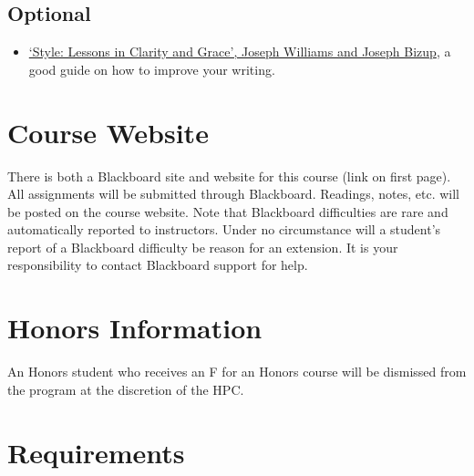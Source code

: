 \documentclass[article,oneside]{memoir}
\begin{document}
\subsection{Optional}

\begin{itemize}

\item \href{http://www.amazon.com/Style-Lessons-Clarity-Grace-11th/dp/0321898680/ref=sr_1_1?ie=UTF8&qid=1452356026&sr=8-1&keywords=lessons+in+clarity+and+grace}{`Style: Lessons in Clarity and Grace', Joseph Williams and Joseph Bizup}, a good guide on how to improve your writing. 
\end{itemize}
\section{Course Website}
There is both a Blackboard site and website for this course (link on first page). All assignments will be submitted through Blackboard. Readings, notes, etc. will be posted on the course website. Note that Blackboard difficulties are rare and automatically reported to instructors. Under no circumstance will a student's report of a Blackboard difficulty be reason for an extension. It is your responsibility to contact Blackboard support for help.

\section{Honors Information}
An Honors student who receives an F for an Honors course will be dismissed from the program at the discretion of the HPC.

\section{Requirements}
\end{document}
